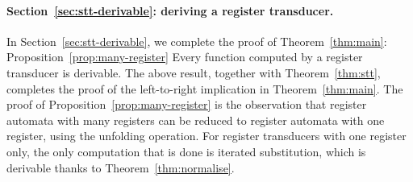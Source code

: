 \paragraph*{Section~\ref{sec:stt-derivable}: deriving a register transducer.}  In Section~\ref{sec:stt-derivable}, we complete the proof of Theorem~\ref{thm:main}:
    \announce
    {Proposition~\ref{prop:many-register}}
    {Every function computed by a register transducer is derivable.}
    The above result, together with Theorem~\ref{thm:stt}, completes the proof of the left-to-right implication in Theorem~\ref{thm:main}. The proof of Proposition~\ref{prop:many-register} is the observation that register automata with many registers can be reduced to register automata with one register, using the unfolding operation. For register transducers with one register only, the only computation that is done is iterated substitution, which is derivable thanks to Theorem~\ref{thm:normalise}.
